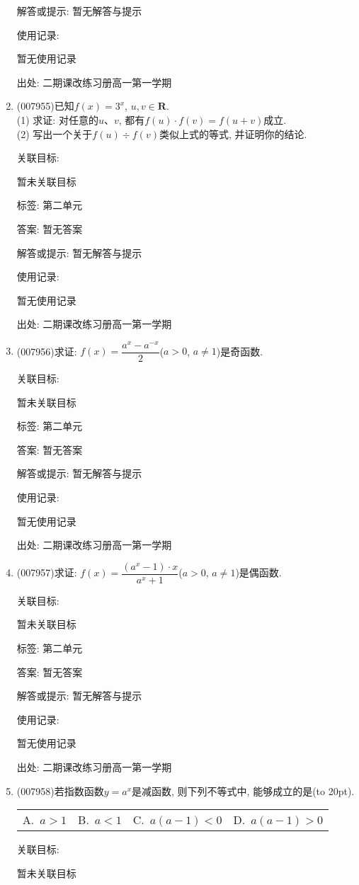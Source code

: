 \documentclass[10pt,a4paper]{article}
\newcommand{\bracket}[1]{(\hbox to #1pt{})}
\newcommand{\fourch}[4]{\par\begin{tabular}{p{.23\textwidth}p{.23\textwidth}p{.23\textwidth}p{.23\textwidth}}
A.~#1 &B.~#2& C.~#3& D.~#4
\end{tabular}}
\begin{document}
\begin{enumerate}[1.]
解答或提示: 暂无解答与提示

使用记录:

暂无使用记录


出处: 二期课改练习册高一第一学期
\item { (007955)}已知$f(x)=3^x$, $u,v\in \mathbf{R}$.\\
(1) 求证: 对任意的$u$、$v$, 都有$f(u)\cdot f(v)=f(u+v)$成立.\\
(2) 写出一个关于$f(u)\div f(v)$类似上式的等式, 并证明你的结论.


关联目标:

暂未关联目标



标签: 第二单元

答案: 暂无答案

解答或提示: 暂无解答与提示

使用记录:

暂无使用记录


出处: 二期课改练习册高一第一学期
\item { (007956)}求证: $f(x)=\dfrac{a^x-a^{-x}}2$($a>0$, $a\ne 1$)是奇函数.


关联目标:

暂未关联目标



标签: 第二单元

答案: 暂无答案

解答或提示: 暂无解答与提示

使用记录:

暂无使用记录


出处: 二期课改练习册高一第一学期
\item { (007957)}求证: $f(x)=\dfrac{(a^x-1)\cdot x}{a^x+1}$($a>0$, $a\ne 1$)是偶函数.


关联目标:

暂未关联目标



标签: 第二单元

答案: 暂无答案

解答或提示: 暂无解答与提示

使用记录:

暂无使用记录


出处: 二期课改练习册高一第一学期
\item { (007958)}若指数函数$y=a^x$是减函数, 则下列不等式中, 能够成立的是\bracket{20}.
\fourch{$a>1$}{$a<1$}{$a(a-1)<0$}{$a(a-1)>0$}


关联目标:

暂未关联目标




\end{enumerate}
\end{document}
